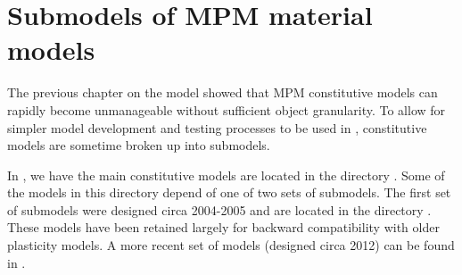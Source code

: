 \chapter{Submodels of MPM material models}
The previous chapter on the \Arena model showed that MPM constitutive models can
rapidly become unmanageable without sufficient object granularity.  To allow
for simpler model development and testing processes to be used in \Vaango, 
constitutive models are sometime broken up into submodels.

In \Vaango, we have the main constitutive models are located in the directory
.  Some of the models in
this directory depend of one of two sets of submodels.  The first set of 
submodels were designed circa 2004-2005 and are located in the directory
.  These models have been 
retained largely for backward compatibility with older plasticity models.
A more recent set of models (designed circa 2012) can be found in 
.









